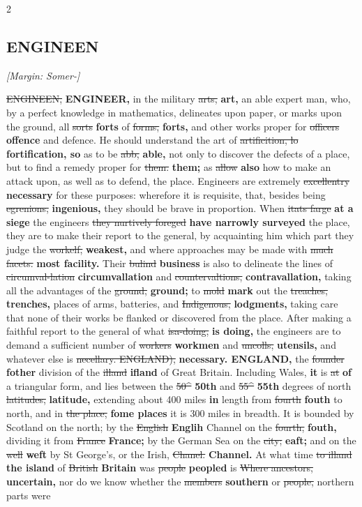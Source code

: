 \documentclass[10pt]{article}
\begin{document}
\begin{multicols}{2}
\subsection*{ENGINEEN}
{\small\itshape [Margin: Somer-]}\par
\sout{ENGINEEN,} \textbf{ENGINEER,} in the military \sout{arts,} \textbf{art,} an able expert man, who, by a perfect knowledge in mathematics, delineates upon paper, or marks upon the ground, all \sout{sorts} \textbf{forts} of \sout{forms,} \textbf{forts,} and other works proper for \sout{officers} \textbf{offence} and defence. He should understand the art of \sout{artificition, lo} \textbf{fortification, so} as to be \sout{abb,} \textbf{able,} not only to discover the defects of a place, but to find a remedy proper for \sout{them.} \textbf{them;} as \sout{allow} \textbf{also} how to make an attack upon, as well as to defend, the place. Engineers are extremely \sout{excellentry} \textbf{necessary} for these purposes: wherefore it is requisite, that, besides being \sout{egrenions,} \textbf{ingenious,} they should be brave in proportion. When \sout{itats farge} \textbf{at a siege} the engineers \sout{they nurtively foreged} \textbf{have narrowly surveyed} the place, they are to make their report to the general, by acquainting him which part they judge the \sout{workelf,} \textbf{weakest,} and where approaches may be made with \sout{much facets.} \textbf{most facility.} Their \sout{bulind} \textbf{business} is also to delineate the lines of \sout{circumval-lation} \textbf{circumvallation} and \sout{countervaltions,} \textbf{contravallation,} taking all the advantages of the \sout{ground,} \textbf{ground;} to \sout{mold} \textbf{mark} out the \sout{treaches,} \textbf{trenches,} places of arms, batteries, and \sout{Indigenous,} \textbf{lodgments,} taking care that none of their works be flanked or discovered from the place. After making a faithful report to the general of what \sout{isa-doing,} \textbf{is doing,} the engineers are to demand a sufficient number of \sout{workers} \textbf{workmen} and \sout{uncolls,} \textbf{utensils,} and whatever else is \sout{necellary. ENGLAND),} \textbf{necessary. ENGLAND,} the \sout{founder} \textbf{fother} division of the \sout{illand} \textbf{ifland} of Great Britain. Including Wales, \textbf{it} is \sout{at} \textbf{of} a triangular form, and lies between the \sout{50\textasciicircum{}} \textbf{50th} and \sout{55\textasciicircum{}} \textbf{55th} degrees of north \sout{latitudes,} \textbf{latitude,} extending about 400 miles \textbf{in} length from \sout{fourth} \textbf{fouth} to north, and in \sout{the place,} \textbf{fome places} it is 300 miles in breadth. It is bounded by Scotland on the north; by the \sout{English} \textbf{Englih} Channel on the \sout{fourth,} \textbf{fouth,} dividing it from \sout{France} \textbf{France;} by the German Sea on the \sout{city;} \textbf{eaft;} and on the \sout{well} \textbf{weft} by St George's, or the Irish, \sout{Chanel.} \textbf{Channel.} At what time \sout{to illand} \textbf{the island} of \sout{British} \textbf{Britain} was \sout{people} \textbf{peopled} is \sout{Where ancestors,} \textbf{uncertain,} nor do we know whether the \sout{members} \textbf{southern} or \sout{people,} northern parts were 
\end{multicols}
\end{document}
